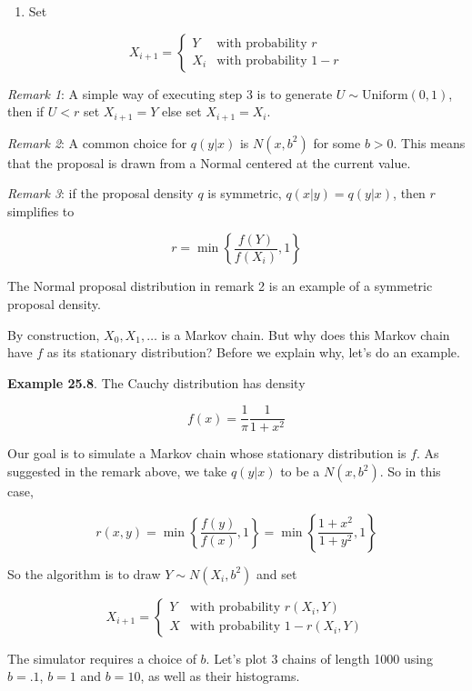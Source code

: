 \begin{enumerate}[tightlist,label={\arabic*.},resume]
\item
  Set
\end{enumerate}

\[
X_{i+1} = \begin{cases}
Y   &\text{with probability } r \\
X_i &\text{with probability } 1 - r 
\end{cases}
\]

\emph{Remark 1}: A simple way of executing step 3 is to generate
\(U \sim \text{Uniform}(0, 1)\), then if \(U < r\) set \(X_{i + 1} = Y\)
else set \(X_{i + 1} = X_i\).

\emph{Remark 2}: A common choice for \(q(y | x)\) is \(N(x, b^2)\) for
some \(b > 0\). This means that the proposal is drawn from a Normal
centered at the current value.

\emph{Remark 3}: if the proposal density \(q\) is symmetric,
\(q(x | y) = q(y | x)\), then \(r\) simplifies to

\[ r = \min \left\{ \frac{f(Y)}{f(X_i)}, 1\right\} \]

The Normal proposal distribution in remark 2 is an example of a
symmetric proposal density.

By construction, \(X_0, X_1, \dots\) is a Markov chain. But why does
this Markov chain have \(f\) as its stationary distribution? Before we
explain why, let's do an example.

\textbf{Example 25.8}. The Cauchy distribution has density

\[ f(x) = \frac{1}{\pi} \frac{1}{1 + x^2} \]

Our goal is to simulate a Markov chain whose stationary distribution is
\(f\). As suggested in the remark above, we take \(q(y | x)\) to be a
\(N(x, b^2)\). So in this case,

\[ r(x, y) = \min \left\{ \frac{f(y)}{f(x)}, 1 \right\} = \min \left\{ \frac{1 + x^2}{1 + y^2} , 1\right\} \]

So the algorithm is to draw \(Y \sim N(X_i, b^2)\) and set

\[ 
X_{i + 1} = \begin{cases}
Y & \text{with probability } r(X_i, Y) \\
X & \text{with probability } 1 - r(X_i, Y)
\end{cases} 
\]

The simulator requires a choice of \(b\). Let's plot 3 chains of length
1000 using \(b = .1\), \(b = 1\) and \(b = 10\), as well as their
histograms.

